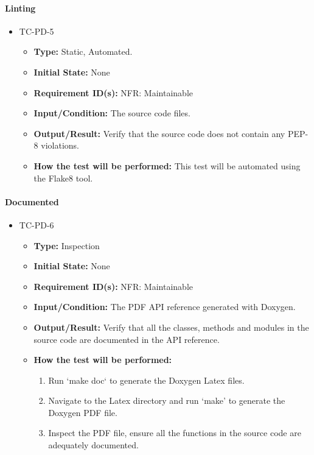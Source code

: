 \documentclass[12pt, titlepage]{article}
\begin{document}
\paragraph{Linting}

\begin{itemize}
\item{TC-PD-5\\}
\begin{itemize}

\item{\textbf{Type:}} Static, Automated.
					
\item{\textbf{Initial State:}} None

\item{\textbf{Requirement ID(s):}} NFR: Maintainable
					
\item{\textbf{Input/Condition:}}  The source code files.
					
\item{\textbf{Output/Result:}} Verify that the source code does not contain any PEP-8 violations.

\item{\textbf{How the test will be performed:}}   This test will be automated using the 
Flake8 \cite{Flake8} tool.

\end{itemize}
\end{itemize}

\paragraph{Documented}
\begin{itemize}
\item{TC-PD-6\\}
\begin{itemize}
\item{\textbf{Type:}} Inspection
					
\item{\textbf{Initial State:}} None

\item{\textbf{Requirement ID(s):}} NFR: Maintainable
					
\item{\textbf{Input/Condition:}}  The PDF API reference generated with Doxygen.
					
\item{\textbf{Output/Result:}} Verify that all the classes, methods and modules in the source
code are documented in the API reference.

\item{\textbf{How the test will be performed:}}  
\begin{enumerate}
\item Run `make doc` to generate the Doxygen Latex files.
\item Navigate to the Latex directory and run `make' to generate the Doxygen PDF file.
\item Inspect the PDF file, ensure all the functions in the source code are adequately documented. 
\end {enumerate}
\end{itemize}
\end{itemize}
\end{document}
